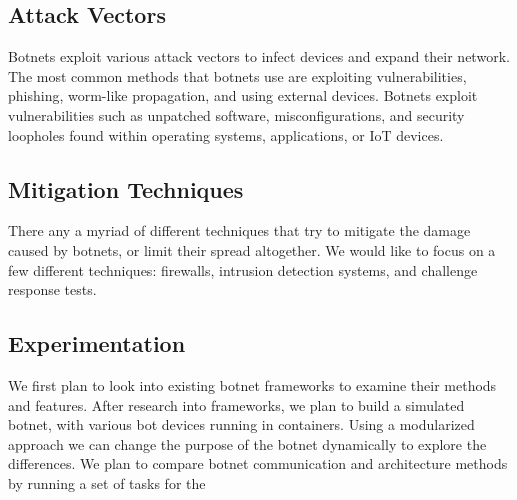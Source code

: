\documentclass[english,12pt]{article}
\begin{document}
\subsection*{Attack Vectors}
Botnets exploit various attack vectors to infect devices 
and expand their network. The most common methods that botnets 
use are exploiting vulnerabilities, phishing, worm-like propagation, 
and using external devices. Botnets exploit vulnerabilities such as 
unpatched software, misconfigurations, and security loopholes 
found within operating systems, applications, or IoT devices. 
\subsection*{Mitigation Techniques}
There any a myriad of different techniques that try to mitigate the damage
caused by botnets, or limit their spread altogether. We would like to focus
on a few different techniques: firewalls, intrusion detection systems, and
challenge response tests. 
\subsection*{Experimentation}
We first plan to look into existing 
botnet frameworks to examine their methods and features. 
After research into frameworks, we plan to build a simulated botnet, 
with various bot devices running in containers. 
Using a modularized approach we can change the purpose of the botnet 
dynamically to explore the differences. We plan to compare botnet 
communication and architecture methods by running a set of tasks for the 
\end{document}
